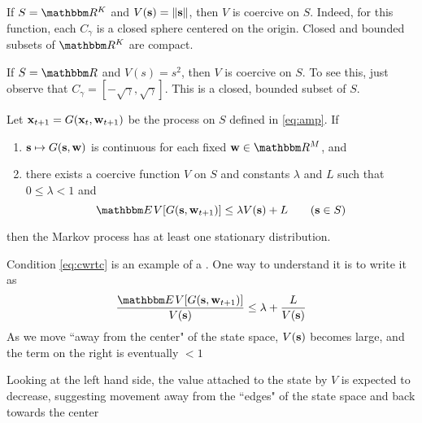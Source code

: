 \begin{frame}

    \vspace{2em}
    \Eg
    If $S = \RR^K$ and $V({\mathbf s}) = \| {\mathbf s} \|$, then $V$ is coercive on
    $S$.  Indeed, for this function, each $C_\gamma$ is a closed sphere
    centered on the origin.  Closed and bounded subsets of $\RR^K$ are compact. 

    \vspace{1em}
    \Eg
    If $S = \RR$ and $V(s) = s^2$, then $V$ is coercive on
    $S$.  To see this, just observe that $C_\gamma = [-\sqrt{\gamma}, \sqrt{\gamma}]$.
    This is a closed, bounded subset of $S$.
  

\end{frame}
 
\begin{frame}

    \vspace{2em}
    \Thm{\textcolor{Brown}{\bf\eqref{ET-t:esd}}}
    Let ${\mathbf x}_{t+1} = G({\mathbf x}_t, {\mathbf w}_{t+1})$ be the process on $S$
    defined in \eqref{eq:amp}.   If
        \begin{enumerate}
            \item ${\mathbf s} \mapsto G({\mathbf s}, {\mathbf w})$ is continuous for each fixed
                $\boldw \in \RR^M$, and
            \item there exists a coercive function $V$ on $S$ and 
                constants $\lambda$ and $L$ such that $0 \leq \lambda < 1$ and
                \begin{equation}
                    \label{eq:cwrtc}
                    \EE  V[ G(\bolds, \boldw_{t+1} ) ] 
                    \leq \lambda V(\bolds) + L
                    \qquad (\bolds \in S)
                \end{equation}
        \end{enumerate}
    then the Markov process has at least one stationary distribution.
    
\end{frame}

\begin{frame}

    \vspace{2em}
    Condition \eqref{eq:cwrtc} is an example of a . 
    One way to understand it is to write it as 
    \begin{equation*}
        \frac{\EE  V[ G(\bolds, \boldw_{t+1} )  ] }{V(\bolds)}
            \leq \lambda + \frac{L}{V(\bolds) }
    \end{equation*}
    As we move ``away from the center" of the state space, $V({\mathbf s})$ becomes
    large, and the term on the right is eventually $< 1$
    
    \vspace{2em}
    Looking at the left hand side, the value attached to the state by $V$ is expected
    to decrease, suggesting movement away from the ``edges" of the state space 
    and back towards the center
    
\end{frame}

